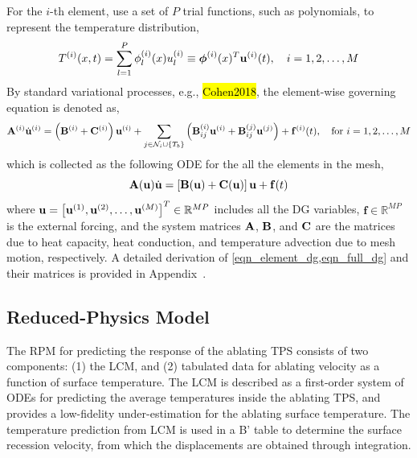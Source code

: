 For the $i$-th element, use a set of $P$ trial functions, such as polynomials, to represent the temperature distribution,
\begin{equation}
    T^{(i)}(x,t) = \sum_{l=1}^{P} \phi_l^{(i)}(x)u_l^{(i)} \equiv \boldsymbol{\phi}^{(i)}(x)^T\mathbf{u}^{(i)}(t),\quad i=1,2,\dots,M\label{eqn_element_temperature}
\end{equation}
By standard variational processes, e.g., \hl{Cohen2018}, the element-wise governing equation is denoted as,
\begin{equation}
    \mathbf{A}^{(i)}\dot{\mathbf{u}}^{(i)} = \left(\mathbf{B}^{(i)} + \mathbf{C}^{(i)}\right)\mathbf{u}^{(i)} + \sum_{j\in\mathcal{N}_i\cup\left\{T_b\right\}}\left(\mathbf{B}^{(i)}_{ij}\mathbf{u}^{(i)} + \mathbf{B}^{(j)}_{ij}\mathbf{u}^{(j)}\right) + \mathbf{f}^{(i)}(t),\quad\text{for }i=1,2,\dots,M\label{eqn_element_dg}
\end{equation}
which is collected as the following ODE for the all the elements in the mesh,
\begin{equation}
    \mathbf{A}(\mathbf{u})\dot{\mathbf{u}} = \left[\mathbf{B}(\mathbf{u}) + \mathbf{C}(\mathbf{u})\right]\mathbf{u} + \mathbf{f}(t)\label{eqn_full_dg}
\end{equation}
where $\mathbf{u} = \left[\mathbf{u}^{(1)}, \mathbf{u}^{(2)}, \ldots, \mathbf{u}^{(M)}\right]^T\in\mathbb{R}^{MP}$ includes all the DG variables, $\mathbf{f}\in\mathbb{R}^{MP}$ is the external forcing, and the system matrices $\mathbf{A}$, $\mathbf{B}$, and $\mathbf{C}$ are the matrices due to heat capacity, heat conduction, and temperature advection due to mesh motion, respectively. A detailed derivation of \cref{eqn_element_dg,eqn_full_dg} and their matrices is provided in Appendix~\cite{appendix}.

\subsection{Reduced-Physics Model}
The RPM for predicting the response of the ablating TPS consists of two components: (1) the LCM, and (2) tabulated data for ablating velocity as a function of surface temperature. The LCM is described as a first-order system of ODEs for predicting the average temperatures inside the ablating TPS, and provides a low-fidelity under-estimation for the ablating surface temperature. The temperature prediction from LCM is used in a B' table to determine the surface recession velocity, from which the displacements are obtained through integration.

